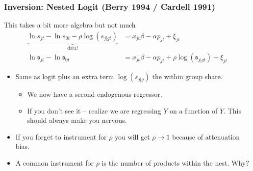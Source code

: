 \documentclass[aspectratio=169,10pt]{beamer}
\begin{document}
\begin{frame}
\frametitle{Inversion: Nested Logit (Berry 1994 / Cardell 1991)}
This takes a bit more algebra but not much
\begin{align*}
\underbrace{\ln s_{jt}- \ln s_{0t}  - \rho \log(s_{j|gt}) }_{\text{data!}}&= x_{jt} \beta -\alpha p_{jt} +  \xi_{jt} \\
\ln \mathfrak{s}_{jt}- \ln \mathfrak{s}_{0t} &= x_{jt} \beta -\alpha p_{jt} +  \rho \log(\mathfrak{s}_{j|gt})  +  \xi_{jt}
\end{align*}
 \begin{itemize}
\item Same as logit plus an extra term $\log(s_{j|g})$ the \alert{within group share}.
\begin{itemize}
\item We now have a second endogenous regressor.
\item If you don't see it -- realize we are regressing $Y$ on a function of $Y$. This should always make you nervous.
 \end{itemize}
\item If you forget to instrument for $\rho$ you will get $\rho \rightarrow 1$ because of \alert{attenuation bias}.
\item A common instrument for $\rho$ is the number of products within the nest. Why?
 \end{itemize}
\end{frame}
\end{document}
